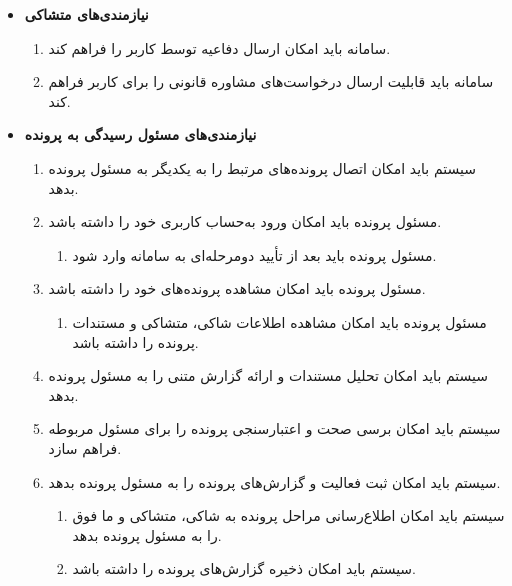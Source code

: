 \documentclass[12pt,a4paper,oneside]{article}
\begin{document}
\begin{itemize}
		\item
		\textbf{نیازمندی‌های متشاکی}
		\begin{enumerate}
			\renewcommand{\labelenumi}{\rl{{\arabic{enumi}}}R-}
			\setcounter{enumi}{18}
	
			\item 
			سامانه باید امکان ارسال دفاعیه توسط کاربر را فراهم کند.
	
			\item 
			سامانه باید قابلیت ارسال درخواست‌های مشاوره قانونی را برای کاربر فراهم کند.
		\end{enumerate}
	
		\item
		\textbf{نیازمندی‌های مسئول رسیدگی به پرونده}
		\begin{enumerate}
			\renewcommand{\labelenumi}{\rl{{\arabic{enumi}}}R-}
			\setcounter{enumi}{20}
	
			\item 
			سیستم باید امکان اتصال پرونده‌های مرتبط را به یکدیگر به مسئول پرونده بدهد.
	
			\item 
			مسئول پرونده باید امکان ورود به‌حساب کاربری خود را داشته باشد.
			\begin{enumerate}
				\renewcommand{\labelenumii}{{\rl{\arabic{enumii}.\arabic{enumi}}}R-}
				\item 
				مسئول پرونده باید بعد از تأیید دومرحله‌ای به سامانه وارد شود.
			\end{enumerate}
	
			\item 
			مسئول پرونده باید امکان مشاهده پرونده‌های خود را داشته باشد.
			\begin{enumerate}
				\renewcommand{\labelenumii}{{\rl{\arabic{enumii}.\arabic{enumi}}}R-}
				\item 
				مسئول پرونده باید امکان مشاهده اطلاعات شاکی، متشاکی و مستندات پرونده را داشته باشد.
			\end{enumerate}
	
			\item 
			سیستم باید امکان تحلیل مستندات و ارائه گزارش متنی را به مسئول پرونده بدهد.
	
			\item 
			سیستم باید امکان برسی صحت و اعتبارسنجی پرونده را برای مسئول مربوطه فراهم سازد.
	
			\item 
			سیستم باید امکان ثبت فعالیت و گزارش‌های پرونده را به مسئول پرونده بدهد.
			\begin{enumerate}
				\renewcommand{\labelenumii}{{\rl{\arabic{enumii}.\arabic{enumi}}}R-}
				\item 
				سیستم باید امکان اطلاع‌رسانی مراحل پرونده به شاکی، متشاکی و ما فوق را به مسئول پرونده بدهد.
				\item 
				سیستم باید امکان ذخیره گزارش‌های پرونده را داشته باشد.
			\end{enumerate}
	

\end{enumerate}
\end{itemize}
\end{document}
